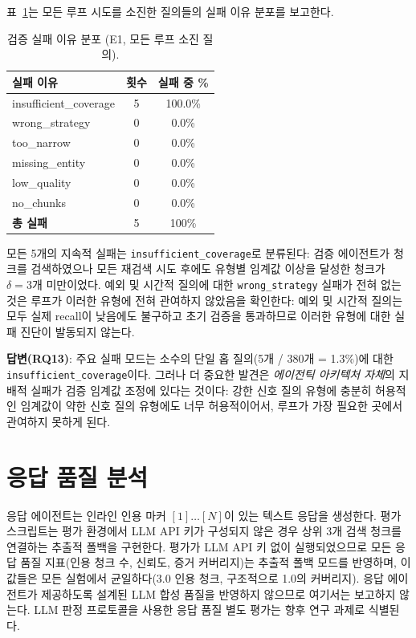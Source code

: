 표~\ref{tab:v2_failure_modes_ko}는 모든 루프 시도를 소진한 질의들의 실패 이유 분포를 보고한다.

\begin{table}[htbp]
\centering
\caption{검증 실패 이유 분포 (E1, 모든 루프 소진 질의).}
\label{tab:v2_failure_modes_ko}
\begin{tabular}{lcc}
\toprule
\textbf{실패 이유} & \textbf{횟수} & \textbf{실패 중 \%} \\
\midrule
insufficient\_coverage & 5 & 100.0\% \\
wrong\_strategy        & 0 & 0.0\% \\
too\_narrow            & 0 & 0.0\% \\
missing\_entity        & 0 & 0.0\% \\
low\_quality           & 0 & 0.0\% \\
no\_chunks             & 0 & 0.0\% \\
\midrule
\textbf{총 실패} & 5 & 100\% \\
\bottomrule
\end{tabular}
\end{table}

모든 5개의 지속적 실패는 \texttt{insufficient\_coverage}로 분류된다: 검증 에이전트가 청크를 검색하였으나 모든 재검색 시도 후에도 유형별 임계값 이상을 달성한 청크가 $\delta{=}3$개 미만이었다. 예외 및 시간적 질의에 대한 \texttt{wrong\_strategy} 실패가 전혀 없는 것은 루프가 이러한 유형에 전혀 관여하지 않았음을 확인한다: 예외 및 시간적 질의는 모두 실제 recall이 낮음에도 불구하고 초기 검증을 통과하므로 이러한 유형에 대한 실패 진단이 발동되지 않는다.

\textbf{답변(RQ13)}: 주요 실패 모드는 소수의 단일 홉 질의(5개 / 380개 = 1.3\%)에 대한 \texttt{insufficient\_coverage}이다. 그러나 더 중요한 발견은 \emph{에이전틱 아키텍처 자체}의 지배적 실패가 검증 임계값 조정에 있다는 것이다: 강한 신호 질의 유형에 충분히 허용적인 임계값이 약한 신호 질의 유형에도 너무 허용적이어서, 루프가 가장 필요한 곳에서 관여하지 못하게 된다.


\section{응답 품질 분석}
\label{sec:v2_answer_quality_ko}

응답 에이전트는 인라인 인용 마커 $[1]\ldots[N]$이 있는 텍스트 응답을 생성한다. 평가 스크립트는 평가 환경에서 LLM API 키가 구성되지 않은 경우 상위 3개 검색 청크를 연결하는 추출적 폴백을 구현한다. 평가가 LLM API 키 없이 실행되었으므로 모든 응답 품질 지표(인용 청크 수, 신뢰도, 증거 커버리지)는 추출적 폴백 모드를 반영하며, 이 값들은 모든 실험에서 균일하다(3.0 인용 청크, 구조적으로 1.0의 커버리지). 응답 에이전트가 제공하도록 설계된 LLM 합성 품질을 반영하지 않으므로 여기서는 보고하지 않는다. LLM 판정 프로토콜을 사용한 응답 품질 별도 평가는 향후 연구 과제로 식별된다.

